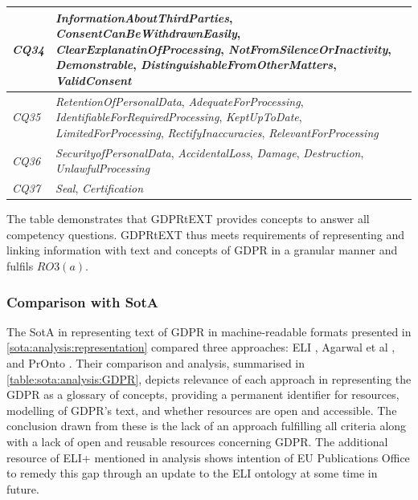 \begin{center}
\begin{tabularx}{\textwidth}{|l|X|}
\textit{CQ34} & \textit{InformationAboutThirdParties}, \textit{ConsentCanBeWithdrawnEasily}, \textit{ClearExplanatinOfProcessing}, \textit{NotFromSilenceOrInactivity}, \textit{Demonstrable}, \textit{DistinguishableFromOtherMatters}, \textit{ValidConsent} \\ \hline
\textit{CQ35} & \textit{RetentionOfPersonalData}, \textit{AdequateForProcessing}, \textit{IdentifiableForRequiredProcessing}, \textit{KeptUpToDate}, \textit{LimitedForProcessing}, \textit{RectifyInaccuracies}, \textit{RelevantForProcessing} \\ \hline
\textit{CQ36} & \textit{SecurityofPersonalData}, \textit{AccidentalLoss}, \textit{Damage}, \textit{Destruction}, \textit{UnlawfulProcessing} \\ \hline
\textit{CQ37} & \textit{Seal}, \textit{Certification} \\
\bottomrule
\end{tabularx}
\end{center}
The table demonstrates that GDPRtEXT provides concepts to answer all  competency questions. GDPRtEXT thus meets requirements of representing and linking information with text and concepts of GDPR in a granular manner and fulfils $RO3(a)$.

\subsubsection{Comparison with SotA}
The SotA in representing text of GDPR in machine-readable formats presented in \autoref{sota:analysis:representation} compared three approaches: ELI \cite{thomas_european_2019}, Agarwal et al \cite{agarwal_legislative_2018}, and PrOnto \cite{palmirani_pronto_2018,palmirani_pronto_compliance_2018}.
Their comparison and analysis, summarised in \autoref{table:sota:analysis:GDPR}, depicts relevance of each approach in representing the GDPR as a glossary of concepts, providing a permanent identifier for resources, modelling of GDPR's text, and whether resources are open and accessible.
The conclusion drawn from these is the lack of an approach fulfilling all criteria along with a lack of open and reusable resources concerning GDPR. 
The additional resource of ELI+ mentioned in analysis shows intention of EU Publications Office to remedy this gap through an update to the ELI ontology at some time in future.

